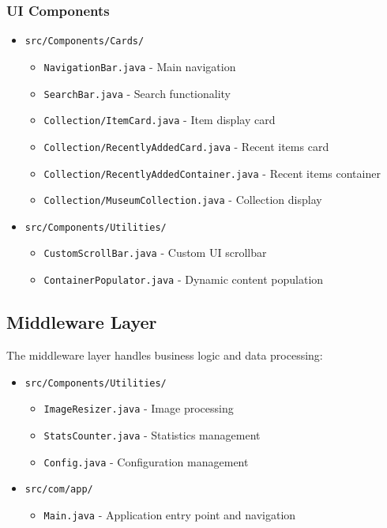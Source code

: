 \documentclass[12pt,a4paper]{article}
\begin{document}
\subsubsection{UI Components}
\begin{itemize}
    \item \texttt{src/Components/Cards/}
    \begin{itemize}
        \item \texttt{NavigationBar.java} - Main navigation
        \item \texttt{SearchBar.java} - Search functionality
        \item \texttt{Collection/ItemCard.java} - Item display card
        \item \texttt{Collection/RecentlyAddedCard.java} - Recent items card
        \item \texttt{Collection/RecentlyAddedContainer.java} - Recent items container
        \item \texttt{Collection/MuseumCollection.java} - Collection display
    \end{itemize}
    
    \item \texttt{src/Components/Utilities/}
    \begin{itemize}
        \item \texttt{CustomScrollBar.java} - Custom UI scrollbar
        \item \texttt{ContainerPopulator.java} - Dynamic content population
    \end{itemize}
\end{itemize}

\subsection{Middleware Layer}
The middleware layer handles business logic and data processing:

\begin{itemize}
    \item \texttt{src/Components/Utilities/}
    \begin{itemize}
        \item \texttt{ImageResizer.java} - Image processing
        \item \texttt{StatsCounter.java} - Statistics management
        \item \texttt{Config.java} - Configuration management
    \end{itemize}
    
    \item \texttt{src/com/app/}
    \begin{itemize}
        \item \texttt{Main.java} - Application entry point and navigation
    \end{itemize}
\end{itemize}
\end{document}
